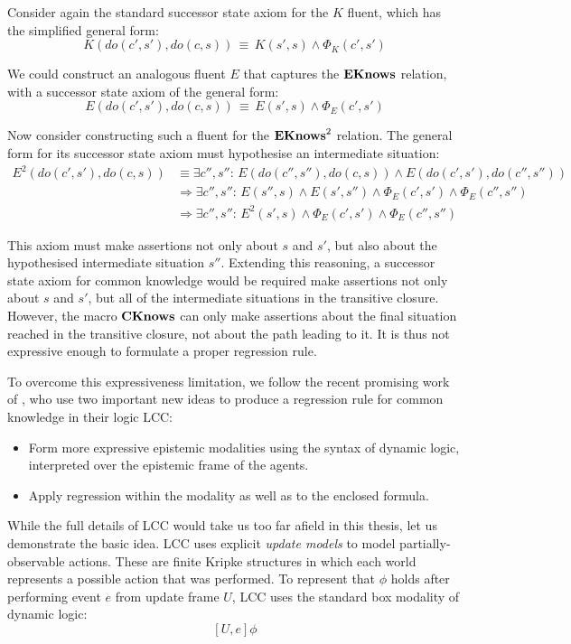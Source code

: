 Consider again the standard successor state axiom for the $K$ fluent,
which has the simplified general form:\[
K(do(c',s'),do(c,s))\,\equiv\, K(s',s)\wedge\Phi_{K}(c',s')\]


We could construct an analogous fluent $E$ that captures the $\mathbf{EKnows}$
relation, with a successor state axiom of the general form:\[
E(do(c',s'),do(c,s))\,\equiv\, E(s',s)\wedge\Phi_{E}(c',s')\]


Now consider constructing such a fluent for the $\mathbf{EKnows}^{2}$ relation.
The general form for its successor state axiom must hypothesise an
intermediate situation:\begin{align*}
E^{2}(do(c',s'),do(c,s)) & \equiv\exists c'',s'':\, E(do(c'',s''),do(c,s))\wedge E(do(c',s'),do(c'',s''))\\
 & \Rightarrow\exists c'',s'':\, E(s'',s)\wedge E(s',s'')\wedge\Phi_{E}(c',s')\wedge\Phi_{E}(c'',s'')\\
 & \Rightarrow\exists c'',s'':\, E^{2}(s',s)\wedge\Phi_{E}(c',s')\wedge\Phi_{E}(c'',s'')\end{align*}


This axiom must make assertions not only about $s$ and $s'$, but
also about the hypothesised intermediate situation $s''$. Extending
this reasoning, a successor state axiom for common knowledge would
be required make assertions not only about $s$ and $s'$, but all
of the intermediate situations in the transitive closure. However,
the macro $\mathbf{CKnows}$ can only make assertions about the final situation
reached in the transitive closure, not about the path leading to it.
It is thus not expressive enough to formulate a proper regression
rule.

To overcome this expressiveness limitation, we follow the recent promising
work of \citet{vanBenthem06lcc}, who use two important new ideas
to produce a regression rule for common knowledge in their logic LCC:

\begin{itemize}
\item Form more expressive epistemic modalities using the syntax of dynamic
logic, interpreted over the epistemic frame of the agents. 
\item Apply regression within the modality as well as to the enclosed formula. 
\end{itemize}
While the full details of LCC would take us too far afield in this
thesis, let us demonstrate the basic idea. LCC uses explicit \emph{update
models} to model partially-observable actions. These are finite Kripke
structures in which each world represents a possible action that was
performed. To represent that $\phi$ holds after performing event
$e$ from update frame $U$, LCC uses the standard box modality of
dynamic logic:\[
[U,e]\phi\]


